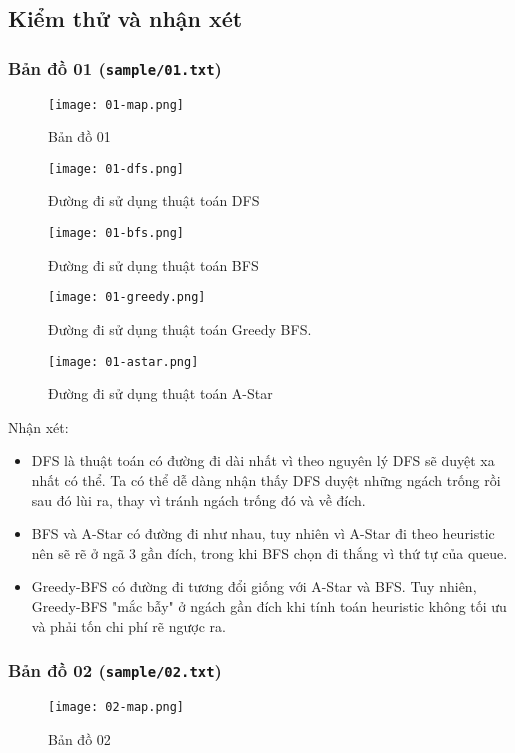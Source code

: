\documentclass[12pt]{article}
\begin{document}
\subsection{Kiểm thử và nhận xét}
\subsubsection{Bản đồ 01 (\texttt{sample/01.txt})}
\begin{figure}[H]
\centering
\texttt{[image: 01-map.png]}
\caption{Bản đồ 01}
\end{figure}

\begin{figure}[H]
\centering
\texttt{[image: 01-dfs.png]}
\caption{Đường đi sử dụng thuật toán DFS}
\end{figure}

\begin{figure}[H]
\centering
\texttt{[image: 01-bfs.png]}
\caption{Đường đi sử dụng thuật toán BFS}
\end{figure}

\begin{figure}[H]
\centering
\texttt{[image: 01-greedy.png]}
\caption{Đường đi sử dụng thuật toán Greedy BFS.}
\end{figure}

\begin{figure}[H]
\centering
\texttt{[image: 01-astar.png]}
\caption{Đường đi sử dụng thuật toán A-Star}
\end{figure}


Nhận xét: 
\begin{itemize}
\item DFS là thuật toán có đường đi dài nhất vì theo nguyên lý DFS sẽ duyệt xa nhất có thể. Ta có thể dễ dàng nhận thấy DFS duyệt những ngách trống rồi sau đó lùi ra, thay vì tránh ngách trống đó và về đích.
\item BFS và A-Star có đường đi như nhau, tuy nhiên vì A-Star đi theo heuristic nên sẽ rẽ ở ngã 3 gần đích, trong khi BFS chọn đi thắng vì thứ tự của queue.
\item Greedy-BFS có đường đi tương đổi giống với A-Star và BFS. Tuy nhiên, Greedy-BFS "mắc bẫy" ở ngách gần đích khi tính toán heuristic không tối ưu và phải tốn chi phí rẽ ngược ra.
\end{itemize}

\subsubsection{Bản đồ 02 (\texttt{sample/02.txt})}
\begin{figure}[H]
	\centering
	\texttt{[image: 02-map.png]}
	\caption{Bản đồ 02}
\end{figure}
\end{document}
